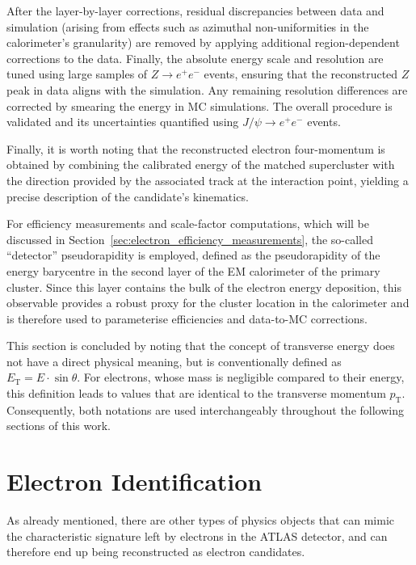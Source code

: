 After the layer-by-layer corrections, residual discrepancies between data and simulation (arising from effects such as azimuthal non-uniformities in the calorimeter's granularity) are removed by applying additional region-dependent corrections to the data. Finally, the absolute energy scale and resolution are tuned using large samples of \(Z\to e^+e^-\) events, ensuring that the reconstructed \(Z\) peak in data aligns with the simulation. Any remaining resolution differences are corrected by smearing the energy in MC simulations. The overall procedure is validated and its uncertainties quantified using \(J/\psi\to e^+e^-\) events.  

Finally, it is worth noting that the reconstructed electron four-momentum is obtained by combining the calibrated energy of the matched supercluster with the direction provided by the associated track at the interaction point, yielding a precise description of the candidate’s kinematics.

For efficiency measurements and scale-factor computations, which will be discussed in Section~\ref{sec:electron_efficiency_measurements}, the so-called ``detector'' pseudorapidity is employed, defined as the pseudorapidity of the energy barycentre in the second layer of the EM calorimeter of the primary cluster. Since this layer contains the bulk of the electron energy deposition, this observable provides a robust proxy for the cluster location in the calorimeter and is therefore used to parameterise efficiencies and data-to-MC corrections.

This section is concluded by noting that the concept of transverse energy does not have a direct physical meaning, but is conventionally defined as $E_{\text{T}} = E \cdot \sin\theta$. For electrons, whose mass is negligible compared to their energy, this definition leads to values that are identical to the transverse momentum $p_{\text{T}}$. Consequently, both notations are used interchangeably throughout the following sections of this work.

\section{Electron Identification}

As already mentioned, there are other types of physics objects that can mimic the characteristic signature left by electrons in the ATLAS detector, and can therefore end up being reconstructed as electron candidates. 

